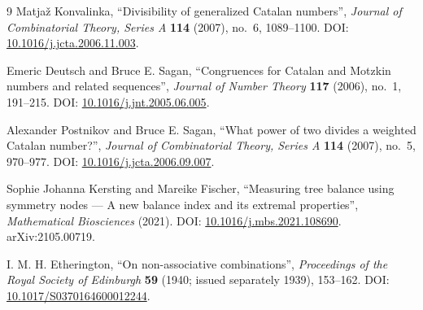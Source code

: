 \documentclass[11pt]{amsart}
\theoremstyle{definition}
\theoremstyle{remark}
\begin{document}
\begin{thebibliography}{9}
Matja\v{z} Konvalinka, ``Divisibility of generalized Catalan numbers'', \emph{Journal of Combinatorial Theory, Series A} \textbf{114} (2007), no.~6, 1089--1100. DOI: \href{https://doi.org/10.1016/j.jcta.2006.11.003}{10.1016/j.jcta.2006.11.003}.

Emeric Deutsch and Bruce E. Sagan, ``Congruences for Catalan and Motzkin numbers and related sequences'', \emph{Journal of Number Theory} \textbf{117} (2006), no.~1, 191--215. DOI: \href{https://doi.org/10.1016/j.jnt.2005.06.005}{10.1016/j.jnt.2005.06.005}.

Alexander Postnikov and Bruce E. Sagan, ``What power of two divides a weighted Catalan number?'', \emph{Journal of Combinatorial Theory, Series A} \textbf{114} (2007), no.~5, 970--977. DOI: \href{https://doi.org/10.1016/j.jcta.2006.09.007}{10.1016/j.jcta.2006.09.007}.

Sophie Johanna Kersting and Mareike Fischer, ``Measuring tree balance using symmetry nodes --- A new balance index and its extremal properties'', \emph{Mathematical Biosciences} (2021). DOI: \href{https://doi.org/10.1016/j.mbs.2021.108690}{10.1016/j.mbs.2021.108690}. arXiv:2105.00719.

I. M. H. Etherington, ``On non-associative combinations'', \emph{Proceedings of the Royal Society of Edinburgh} \textbf{59} (1940; issued separately 1939), 153--162. DOI: \href{https://doi.org/10.1017/S0370164600012244}{10.1017/S0370164600012244}.
\end{thebibliography}
\end{document}
